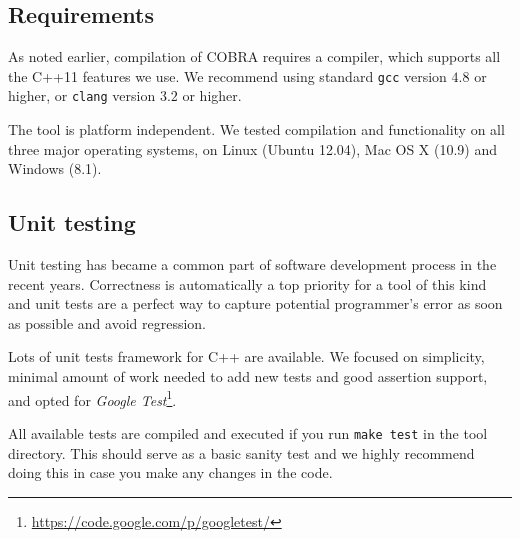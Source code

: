 \subsection{Requirements}
As noted earlier, compilation of COBRA requires a compiler,
  which supports all the C++11 features we use.
We recommend using standard \texttt{gcc} version $4.8$ or higher, or
 \texttt{clang} version $3.2$ or higher.

The tool is platform independent.
  We tested compilation and functionality on
  all three major operating systems, on Linux (Ubuntu 12.04),
  Mac OS X (10.9) and Windows (8.1).

\subsection{Unit testing}
Unit testing has became a common part of software development process
  in the recent years.
Correctness is automatically a top priority for a tool of this kind and
  unit tests are a perfect way to capture potential programmer's error
  as soon as possible and avoid regression.

Lots of unit tests framework for C++ are available.
We focused on simplicity, minimal amount of work needed to add new tests
  and good assertion support, and opted for
  \emph{Google Test}\footnote{\url{https://code.google.com/p/googletest/}}.

All available tests are compiled and executed if you run \texttt{make test}
  in the tool directory.
This should serve as a basic sanity test and we highly recommend
  doing this in case you make any changes in the code.

